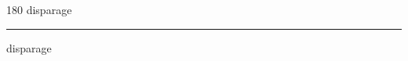 
\begin{frame}
\begin{center}
\begin{turn}{180}
{\fontsize{2.5cm}{1em}\selectfont disparage}
\end{turn}
\vspace{1em}\par  
\hrule
\vspace{1em}\par  
{\fontsize{2.5cm}{1em}\selectfont disparage}
\end{center}
\end{frame}
